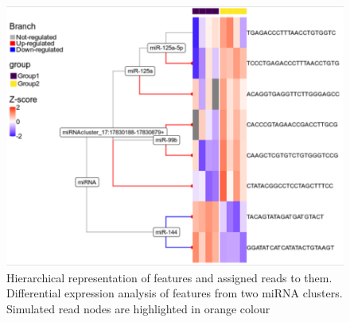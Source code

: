 \documentclass[12pt,twoside]{reedthesis}
\begin{document}
\begin{figure}[H]

{\centering \includegraphics{thesis_files/figure-latex/3f16-1} 

}

\caption{Hierarchical representation of features and assigned reads to them. Differential expression analysis of features from two miRNA clusters. Simulated read nodes are highlighted in orange colour}\label{fig:3f16}
\end{figure}
\end{document}
